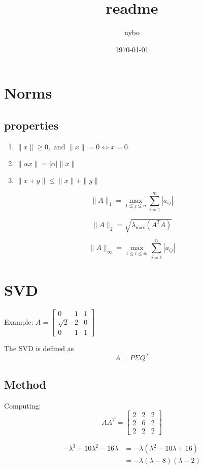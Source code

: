 \documentclass[a4paper]{article}
\author{nybo}
\date{\today}
\title{readme}
\begin{document}
\maketitle
\tableofcontents


\section{Norms}
\label{sec-1}
\subsection*{properties}
\label{sec-1-1}
\begin{enumerate}
\item $\|x\| \geq 0, \text { and }\|x\|=0 \Longleftrightarrow x=0$
\item $\|\alpha x\|=|\alpha|\|x\|$
\item $\|x+y\| \leq\|x\|+\|y\|$
\end{enumerate}

$$
\|A\|_{1}=\max _{1 \leq j \leq n} \sum_{i=1}^{m}\left|a_{i j}\right|
$$

$$
\|A\|_{2}=\sqrt{\lambda_{\max }\left(A^{T} A\right)}
$$


$$
\|A\|_{\infty}=\max _{1 \leq i \leq m} \sum_{j=1}^{n}\left|a_{i j}\right|
$$


\section{SVD}
\label{sec-2}
Example: 
$A=\left[\begin{array}{lll}{0} & {1} & {1} \\ {\sqrt{2}} & {2} & {0} \\ {0} & {1} & {1}\end{array}\right]$

The SVD is defined as
$$
A=P \Sigma Q^{T}
$$

\subsection*{Method}
\label{sec-2-1}
Computing:
$$
A A^{T}=\left[\begin{array}{lll}{2} & {2} & {2} \\ {2} & {6} & {2} \\ {2} & {2} & {2}\end{array}\right]
$$

\begin{equation}
\begin{aligned}
-\lambda^{3}+10 \lambda^{2}-16 \lambda &=-\lambda\left(\lambda^{2}-10 \lambda+16\right) \\
 &=-\lambda(\lambda-8)(\lambda-2) 
\end{aligned}
\end{equation}
\end{document}
